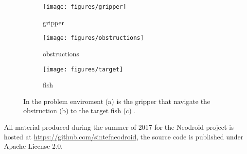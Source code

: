 \begin{figure}
\centering
\begin{subfigure}[t]{0.33\textwidth}
\centering
\texttt{[image: figures/gripper]}
\caption{gripper}
\label{fig:gripper-sim}
\end{subfigure}%
    \hfill
\begin{subfigure}[t]{0.33\textwidth}
\centering
\texttt{[image: figures/obstructions]}
\caption{obstructions}
\label{fig:obstructions-sim}
\end{subfigure}%
    \hfill
\begin{subfigure}[t]{0.33\textwidth}
\centering
\texttt{[image: figures/target]}
\caption{fish}
\label{fig:fish-sim}
\end{subfigure}%

\caption{In the problem enviroment 
(a) %
is the gripper that navigate the obstruction 
(b) %
to the target fish 
(c)%
.}
\label{fig:problem-environment}
\end{figure}

All material produced during the summer of 2017 for the Neodroid project is hosted at \url{https://github.com/sintefneodroid}, the source code is published under Apache License 2.0.